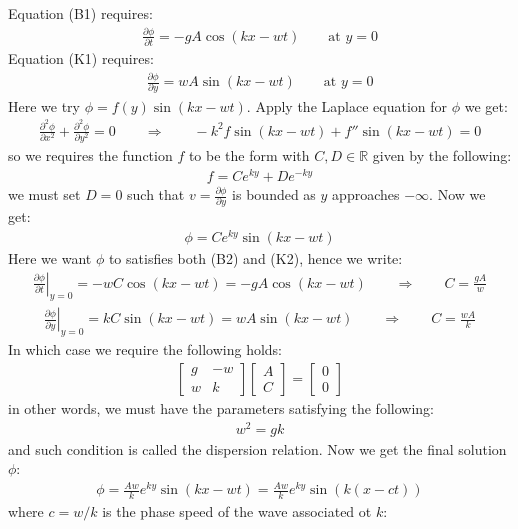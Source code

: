 \documentclass[11pt]{book}
\theoremstyle{break}
\theoremstyle{break}
\newcommand{\R}{\mathbb{R}}
\newcommand{\bmat}[1]{\begin{bmatrix} #1 \end{bmatrix}}
\begin{document}
Equation (B1) requires:
\begin{align*}
\frac{\partial \phi}{\partial t} = -g A \cos(kx-wt) \qquad\text{at }y=0	 \tag{B2}
\end{align*}
Equation (K1) requires:
\begin{align*}
\frac{\partial \phi}{\partial y} = w A \sin(kx-wt) \qquad \text{at }y=0    \tag{K2}
\end{align*}
Here we try $\phi = f(y) \sin(kx-wt)$. Apply the Laplace equation for $\phi$ we get:
\begin{align*}
\frac{\partial^2 \phi}{\partial x^2} + \frac{\partial^2 \phi}{\partial y^2} = 0 \qquad \Rightarrow \qquad -k^2 f\sin(kx-wt) + f'' \sin(kx-wt) = 0
\end{align*}
so we requires the function $f$ to be the form with $C,D \in \R$ given by the following:
\begin{align*}
f = Ce^{ky} + De^{-ky}
\end{align*}
we must set $D = 0$ such that $v = \frac{\partial \phi}{\partial y}$ is bounded as $y$ approaches $-\infty$. Now we get:
\begin{align*}
\phi = C e^{ky} \sin(kx-wt) \tag{G}
\end{align*}
Here we want $\phi$ to satisfies both (B2) and (K2), hence we write:
\begin{align*}
\left.\frac{\partial \phi}{\partial t}\right|_{y=0} = -w C\cos(kx-wt) = -gA \cos(kx-wt) \qquad \Rightarrow \qquad C = \frac{gA}{w}
\end{align*}
\begin{align*}
\left.\frac{\partial \phi}{\partial y}\right|_{y=0} = kC \sin(kx-wt) = wA \sin(kx-wt) \qquad \Rightarrow \qquad C = \frac{wA}{k}
\end{align*}
In which case we require the following holds:
\begin{align*}
\bmat{g & -w \\ w & k} \bmat{A \\ C} = \bmat{ 0 \\ 0}
\end{align*}
in other words, we must have the parameters satisfying the following:
\begin{align*}
w^2 = gk
\end{align*}
and such condition is called the dispersion relation. Now we get the final solution $\phi$:
\begin{align}
\phi = \frac{Aw}{k}e^{ky}\sin(kx-wt) = \frac{Aw}{k}e^{ky} \sin(k(x-ct))
\end{align}
where $c = w/k$ is the phase speed of the wave associated ot $k$:
\end{document}
